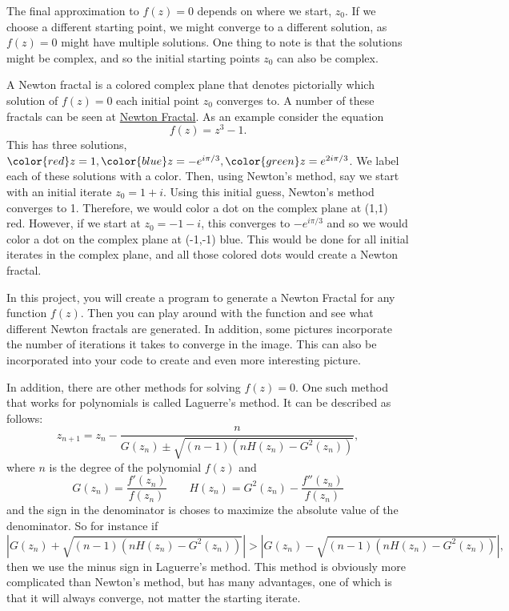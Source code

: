 \documentclass{article}
\begin{document}
	 The final approximation to $f(z) = 0$ depends on where we start, $z_0$.  If we choose a different starting point, we might converge to a different solution, as $f(z) = 0$ might have multiple solutions.  One thing to note is that the solutions might be complex, and so the initial starting points $z_0$ can also be complex.
	 
	 A Newton fractal is a colored complex plane that denotes pictorially which solution of $f(z) = 0$ each initial point $z_0$ converges to.  A number of these fractals can be seen at {\color{blue}\href{https://en.wikipedia.org/wiki/Newton_fractal}{Newton Fractal}}.  As an example consider the equation 
	 \[ f(z) = z^3 - 1.\]
	 This has three solutions, ${\color{red}z=1}, {\color{blue}z= -e^{i\pi/3}}, {\color{green}z = e^{2i\pi/3}}$.  We label each of these solutions with a color.  Then, using Newton's method, say we start with an initial iterate $z_0 = 1+i$.  Using this initial guess, Newton's method converges to 1.  Therefore, we would color a dot on the complex plane at (1,1) red.  However, if we start at $z_0 = -1-i$, this converges to $-e^{i\pi/3}$ and so we would color a dot on the complex plane at (-1,-1) blue.  This would be done for all initial iterates in the complex plane, and all those colored dots would create a Newton fractal.
	 
	 In this project, you will create a program to generate a Newton Fractal for any function $f(z)$.  Then you can play around with the function and see what different Newton fractals are generated.  In addition, some pictures incorporate the number of iterations it takes to converge in the image.  This can also be incorporated into your code to create and even more interesting picture.
	 
	 In addition, there are other methods for solving $f(z) = 0$.  One such  method that works for polynomials is called Laguerre's method.  It can be described as follows:
	 \[ z_{n+1} = z_n - \frac{n}{G(z_n) \pm \sqrt{(n-1)(nH(z_n) - G^2(z_n))}},\]
	 where $n$ is the degree of the polynomial $f(z)$ and
	 \[ G(z_n) = \frac{f'(z_n)}{f(z_n)} \qquad H(z_n) = G^2(z_n) - \frac{f''(z_n)}{f(z_n)} \]
	 and the sign in the denominator is choses to maximize the absolute value of the denominator.  So for instance if 
	 \[\left|G(z_n) + \sqrt{(n-1)(nH(z_n) - G^2(z_n))} \right| > \left|G(z_n) - \sqrt{(n-1)(nH(z_n) - G^2(z_n))} \right|,\]
	 then we use the minus sign in Laguerre's method.  This method is obviously more complicated than Newton's method,  but has many advantages, one of which is that it will always converge, not matter the starting iterate.
\end{document}
